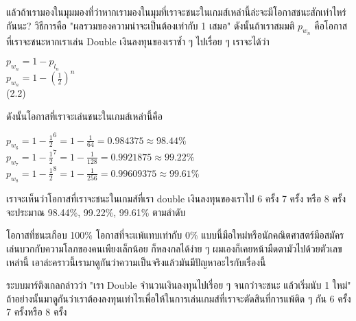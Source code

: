 \documentclass[12pt]{article}
\begin{document}
แล้วถ้าเรามองในมุมมองที่ว่าหากเรามองในมุมที่เราจะชนะในเกมส์เหล่านี้ล่ะจะมีโอกาสชนะสักเท่าไหร่กันนะ? วิธีการคือ "ผลรวมของความน่าจะเป็นต้องเท่ากับ 1 เสมอ" ดังนั้นถ้าเราสมมติ $p_{w_n}$ คือโอกาสที่เราจะชนะหากเราเล่น Double เงินลงทุนของเราซ้ำ ๆ ไปเรื่อย ๆ เราจะได้ว่า
\begin{center}
$p_{w_n} = 1-p_{l_n}$ \\
$p_{w_n} = 1-(\frac{1}{2})^n$ \\
(2.2)
\end{center}
ดังนั้นโอกาสที่เราจะเล่นชนะในเกมส์เหล่านี้คือ 
\begin{center}
	$p_{w_6}=1-\frac{1}{2}^6=1-\frac{1}{64}=0.984375\approx98.44\%$\\
	$p_{w_7}=1-\frac{1}{2}^7=1-\frac{1}{128}=0.9921875\approx99.22\%$\\
	$p_{w_8}=1-\frac{1}{2}^8=1-\frac{1}{256}=0.99609375\approx99.61\%$\\
\end{center}
เราจะเห็นว่าโอกาสที่เราจะชนะในเกมส์ที่เรา double เงินลงทุนของเราไป 6 ครั้ง 7 ครั้ง หรือ 8 ครั้งจะประมาณ 98.44\%, 99.22\%, 99.61\% ตามลำดับ 

โอกาสที่ชนะเกือบ 100\% โอกาสที่จะแพ้แทบเท่ากับ 0\% แบบนี้มือใหม่หรือนักคณิตศาสตร์มือสมัครเล่นบวกกับความโลภของคนเพียงเล็กน้อย ก็หลงกลได้ง่าย ๆ ผมเองก็เคยหน้ามืดตามัวไปด้วยตัวเลขเหล่านี้ เอาล่ะคราวนี้เรามาดูกันว่าความเป็นจริงแล้วมันมีปัญหาอะไรกับเรื่องนี้

ระบบมาร์ติงเกลกล่าวว่า "เรา Double จำนวนเงินลงทุนไปเรื่อย ๆ จนกว่าจะชนะ แล้วเริ่มนับ 1 ใหม่" ถ้าอย่างนั้นมาดูกันว่าเราต้องลงทุนเท่าไรเพื่อให้ในการเล่นเกมส์ที่เราจะตัดสินที่การแพ้ติด ๆ กัน 6 ครั้ง 7 ครั้งหรือ 8 ครั้ง 
\end{document}
